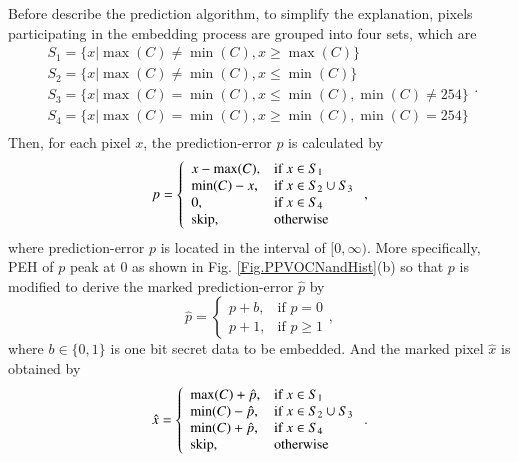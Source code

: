 \documentclass[review,3p,10pt,sort&compress]{elsarticle}
\begin{document}
Before describe the prediction algorithm, to simplify the explanation, pixels participating in the embedding process are grouped into four sets, which are
\begin{equation*}\label{eq:PPVOCNandHist}
\begin{array}{ll}
S_1 = \{ x | \max(C) \neq \min(C), x \geq \max(C) \} \\
S_2 = \{ x | \max(C) \neq \min(C), x \leq \min(C) \} \\
S_3 = \{ x | \max(C)   =  \min(C), x \leq \min(C), \min(C) \neq 254 \} \\
S_4 = \{ x | \max(C)   =  \min(C), x \geq \min(C), \min(C)   =  254 \} \\
\end{array}.
\end{equation*}
Then, for each pixel $x$, the prediction-error $p$ is calculated by
\begin{equation}\label{eq:PPVOPE}
p = \left\{\begin{array}{ll}
x - \max(C),    & \text{if } x \in S_1  \\
\min(C) - x,    & \text{if } x \in S_2 \cup S_3 \\
0,              & \text{if } x \in S_4 \\
{\rm skip},     & \text{otherwise}
\end{array}\right.,
\end{equation}
where prediction-error $p$ is located in the interval of $[0, \infty)$. More specifically, PEH of $p$ peak at 0 as shown in Fig. \ref{Fig.PPVOCNandHist}(b) so that $p$ is modified to derive the marked prediction-error $\hat{p}$ by
\begin{equation}\label{eq:PPVOMPE}
\hat{p} = \left\{\begin{array}{ll}
p + b,  & \text{if } p = 0      \\
p + 1,  & \text{if } p \geq 1
\end{array}\right.,
\end{equation}
where $b \in \{0,1\}$ is one bit secret data to be embedded. And the marked pixel $\hat{x}$ is obtained by
\begin{equation}\label{eq:PPVOMPixel}
\hat{x} = \left\{\begin{array}{ll}
\max(C) + \hat{p},  & \text{if } x \in S_1 \\
\min(C) - \hat{p},  & \text{if } x \in S_2 \cup S_3 \\
\min(C) + \hat{p},  & \text{if } x \in S_4 \\
{\rm skip},         & \text{otherwise}
\end{array}\right..
\end{equation}
\end{document}
